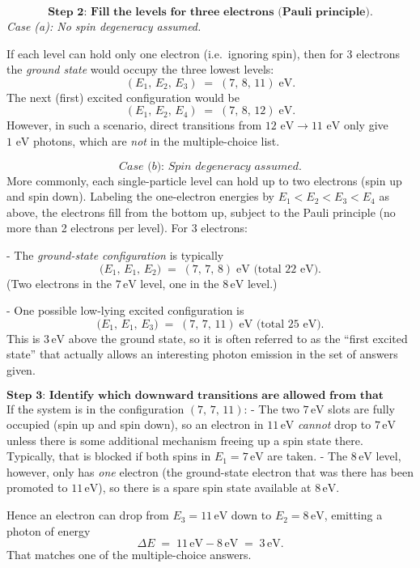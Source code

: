 \documentclass[12pt]{article}
\theoremstyle{definition} %
\theoremstyle{plain} %
\begin{document}
\[
\textbf{Step 2: Fill the levels for three electrons (Pauli principle).}
\]
\textit{Case (a): No spin degeneracy assumed.}

If each level can hold only one electron (i.e.\ ignoring spin), then for 3 electrons the \emph{ground state} would occupy the three lowest levels:
\[
(E_1,\,E_2,\,E_3) \;=\; (7,\,8,\,11)\;\text{eV}.
\]
The next (first) excited configuration would be
\[
(E_1,\,E_2,\,E_4) \;=\; (7,\,8,\,12)\;\text{eV}.
\]
However, in such a scenario, direct transitions from $12\text{ eV}\to 11\text{ eV}$ only give $1\text{ eV}$ photons, which are \emph{not} in the multiple-choice list.

\[
\textit{Case (b): Spin degeneracy assumed.}
\]
More commonly, each single-particle level can hold up to two electrons (spin up and spin down).  Labeling the one-electron energies by $E_1 < E_2 < E_3 < E_4$ as above, the electrons fill from the bottom up, subject to the Pauli principle (no more than 2 electrons per level).  For 3 electrons:

- The \emph{ground-state configuration} is typically
\[
\bigl(E_1,\,E_1,\,E_2\bigr) 
\;=\;
(7,\,7,\,8)\;\text{eV (total }22\text{ eV).}
\]
  (Two electrons in the $7\,\mathrm{eV}$ level, one in the $8\,\mathrm{eV}$ level.)

- One possible low-lying excited configuration is
\[
\bigl(E_1,\,E_1,\,E_3\bigr) 
\;=\;
(7,\,7,\,11)\;\text{eV (total }25\text{ eV).}
\]
  This is $3\,\mathrm{eV}$ above the ground state, so it is often referred to as the “first excited state” that actually allows an interesting photon emission in the set of answers given.

\[
\textbf{Step 3: Identify which downward transitions are allowed from that excited state.}
\]
If the system is in the configuration $(7,\,7,\,11)$:
- The two $7\,\mathrm{eV}$ slots are fully occupied (spin up and spin down), so an electron in $11\,\mathrm{eV}$ \emph{cannot} drop to $7\,\mathrm{eV}$ unless there is some additional mechanism freeing up a spin state there.  Typically, that is blocked if both spins in $E_1=7\,\mathrm{eV}$ are taken.
- The $8\,\mathrm{eV}$ level, however, only has \emph{one} electron (the ground-state electron that was there has been promoted to $11\,\mathrm{eV}$), so there is a spare spin state available at $8\,\mathrm{eV}.$

Hence an electron can drop from $E_3 = 11\,\mathrm{eV}$ down to $E_2 = 8\,\mathrm{eV}$, emitting a photon of energy
\[
\Delta E \;=\; 11\,\mathrm{eV} - 8\,\mathrm{eV} \;=\; 3\,\mathrm{eV}.
\]
That matches one of the multiple-choice answers.
\end{document}
